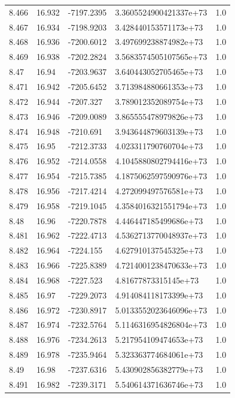 \begin{tabular}{lllll}
8.466 & 16.932 & -7197.2395 & 3.3605524900421337e+73 & 1.0 \\
8.467 & 16.934 & -7198.9203 & 3.428440153571173e+73 & 1.0 \\
8.468 & 16.936 & -7200.6012 & 3.497699238874982e+73 & 1.0 \\
8.469 & 16.938 & -7202.2824 & 3.5683574505107565e+73 & 1.0 \\
8.47 & 16.94 & -7203.9637 & 3.640443052705465e+73 & 1.0 \\
8.471 & 16.942 & -7205.6452 & 3.713984880661353e+73 & 1.0 \\
8.472 & 16.944 & -7207.327 & 3.789012352089754e+73 & 1.0 \\
8.473 & 16.946 & -7209.0089 & 3.865555478979826e+73 & 1.0 \\
8.474 & 16.948 & -7210.691 & 3.943644879603139e+73 & 1.0 \\
8.475 & 16.95 & -7212.3733 & 4.023311790760704e+73 & 1.0 \\
8.476 & 16.952 & -7214.0558 & 4.1045880802794416e+73 & 1.0 \\
8.477 & 16.954 & -7215.7385 & 4.1875062597590976e+73 & 1.0 \\
8.478 & 16.956 & -7217.4214 & 4.272099497576581e+73 & 1.0 \\
8.479 & 16.958 & -7219.1045 & 4.3584016321551794e+73 & 1.0 \\
8.48 & 16.96 & -7220.7878 & 4.446447185499686e+73 & 1.0 \\
8.481 & 16.962 & -7222.4713 & 4.5362713770048937e+73 & 1.0 \\
8.482 & 16.964 & -7224.155 & 4.627910137545325e+73 & 1.0 \\
8.483 & 16.966 & -7225.8389 & 4.7214001238470633e+73 & 1.0 \\
8.484 & 16.968 & -7227.523 & 4.81677873315145e+73 & 1.0 \\
8.485 & 16.97 & -7229.2073 & 4.914084118173399e+73 & 1.0 \\
8.486 & 16.972 & -7230.8917 & 5.0133552023646096e+73 & 1.0 \\
8.487 & 16.974 & -7232.5764 & 5.1146316954826804e+73 & 1.0 \\
8.488 & 16.976 & -7234.2613 & 5.217954109474653e+73 & 1.0 \\
8.489 & 16.978 & -7235.9464 & 5.323363774684061e+73 & 1.0 \\
8.49 & 16.98 & -7237.6316 & 5.430902856382779e+73 & 1.0 \\
8.491 & 16.982 & -7239.3171 & 5.540614371636746e+73 & 1.0 \\

\end{tabular}
